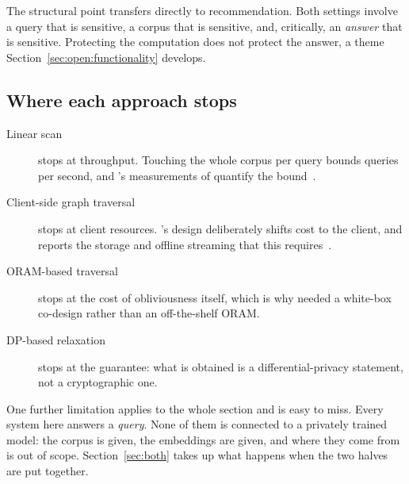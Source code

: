 The structural point transfers directly to recommendation. Both settings involve a query that is
sensitive, a corpus that is sensitive, and, critically, an \emph{answer} that is sensitive.
Protecting the computation does not protect the answer, a theme
Section~\ref{sec:open:functionality} develops.

\subsection{Where each approach stops}
\label{sec:retrieval:stops}

\begin{description}
  \item[Linear scan] stops at throughput. Touching the whole corpus per query bounds queries per
        second, and \wallyplain{}'s measurements of \tiptoeplain{} quantify the
        bound~\cite{wally2024}.
  \item[Client-side graph traversal] stops at client resources. \pacmannplain{}'s design
        deliberately shifts cost to the client, and \wallyplain{} reports the storage and offline
        streaming that this requires~\cite{wally2024}.
  \item[ORAM-based traversal] stops at the cost of obliviousness itself, which is why
        \compassplain{} needed a white-box co-design rather than an off-the-shelf ORAM.
  \item[DP-based relaxation] stops at the guarantee: what is obtained is a differential-privacy
        statement, not a cryptographic one.
\end{description}

One further limitation applies to the whole section and is easy to miss. Every system here answers
a \emph{query}. None of them is connected to a privately trained model: the corpus is given, the
embeddings are given, and where they come from is out of scope. Section~\ref{sec:both} takes up
what happens when the two halves are put together.
